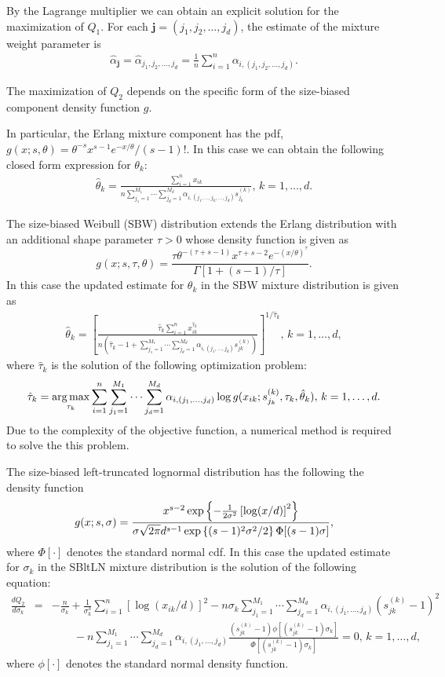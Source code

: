 \documentclass[11pt]{article}
\def\argmax{\operatornamewithlimits{arg\,max}}
\def\a{\alpha} \def\b{\beta}
\def\argmax{\operatornamewithlimits{arg\,max}}
\def\bea{\begin{eqnarray*}} \def\eea{\end{eqnarray*}}
\begin{document}
By the Lagrange multiplier we can obtain an explicit solution for the maximization of $Q_1$. For each $\bm{j} = (j_1,j_2,\ldots,j_d)$, the estimate of the mixture weight parameter is  
\bea
\hat{\a}_{\bm{j}} = \hat{\a}_{j_1,j_2,\ldots,j_d}  = \frac{1}{n}  \sum_{i=1}^n \a_{i,(j_1,j_2,\ldots,j_d)}.
\eea

The maximization of $Q_2$ depends on the specific form of the size-biased component density function $g$.  

In particular, the Erlang mixture component has the pdf, $g(x; s, \theta) = \theta^{-s} x^{s-1}e^{-x/\theta}/(s-1)!$. In this case we can obtain the following closed form expression for $\theta_k$:
\bea
\hat{\theta}_k = \frac{\sum_{i=1}^n x_{ik}}{n \sum_{j_1 = 1}^{M_1} \cdots\sum_{j_d = 1}^{M_d} \a_{i,(j_1,\ldots,j_k, \ldots, j_d)}s^{(k)}_{j_k}},\, k=1,\ldots, d.
\eea

The size-biased Weibull (SBW) distribution extends the Erlang distribution with an additional shape parameter $\tau >0$ whose density function is given as 
$$
g(x;s, \tau, \theta) = \frac{\tau \theta^{-(\tau+ s -1)} x^{\tau + s -2}e^{-(x/\theta)^{\tau}}}{\Gamma[1+(s-1)/\tau]}.
$$
In this case the updated estimate for $\theta_k$ in the SBW mixture distribution is given as
\bea
\hat{\theta}_k = \left[\frac{\hat{\tau}_k \sum_{i=1}^n x^{\hat{\tau}_k}_{ik}}{n\left(\hat{\tau}_k-1 + \sum_{j_1 = 1}^{M_1} \cdots\sum_{j_d = 1}^{M_d} \a_{i,(j_1,\ldots,j_d)} s^{(k)}_{jk}\right)}\right]^{1/\hat{\tau}_k},\, k = 1,\ldots, d,
\eea
where $\hat{\tau}_k$ is the solution of the following optimization problem:
\bea
\hat{\tau}_k = \argmax_{\tau_k} \sum_{i=1}^n \sum_{j_1 = 1}^{M_1} \cdots\sum_{j_d = 1}^{M_d} \a_{i,(j_1,\ldots,j_d)}\log g(x_{ik};s^{(k)}_{j_k}, \tau_k,\hat{\theta}_k),\, k = 1,\ldots, d.
\eea
Due to the complexity of the objective function, a numerical method is required to solve the this problem.

The size-biased left-truncated lognormal distribution has the following the density function 
\bea
g(x;s, \sigma) = \frac{x^{s-2}\exp\left\{-\frac{1}{2\s^2}\left[\log(x/d)\right]^2\right\}}{\sigma \sqrt{2\pi} d^{s-1}\exp\left\{(s-1)^2 \s^2 /2\right\}\Phi[(s-1)\sigma]},
\eea 
where $\Phi[\cdot]$ denotes the standard normal cdf. In this case the updated estimate for $\sigma_k$ in the SBltLN mixture distribution is the solution of the following equation:
\bea
\frac{d Q_2}{d \sigma_k} &=& - \frac{n}{\sigma_k} + \frac{1}{\sigma^3_k} \sum_{i=1}^n\left[\log (x_{ik}/d)\right]^2 - n \sigma_k \sum_{j_1 = 1}^{M_1} \cdots\sum_{j_d = 1}^{M_d} \a_{i,(j_1,\ldots,j_d)} (s^{(k)}_{jk} -1)^2\\
&&\quad\quad - n\sum_{j_1 = 1}^{M_1} \cdots\sum_{j_d = 1}^{M_d} \a_{i,(j_1,\ldots,j_d)} \frac{(s^{(k)}_{jk} -1)\phi[(s^{(k)}_{jk} -1)\sigma_k]}{\Phi[(s^{(k)}_{jk} -1)\sigma_k]} = 0,\,k=1,\ldots,d,
\eea
where $\phi[\cdot]$ denotes the standard normal density function.
 
\end{document}
